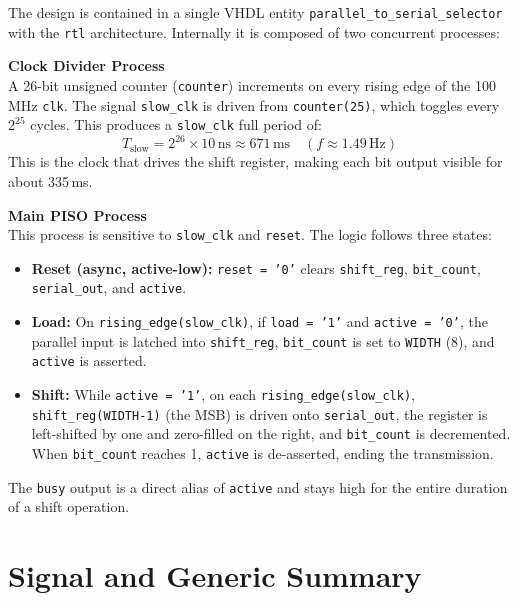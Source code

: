 \documentclass[12pt,a4paper]{report}
\begin{document}
The design is contained in a single VHDL entity \texttt{parallel\_to\_serial\_selector} with the \texttt{rtl} architecture. Internally it is composed of two concurrent processes:

\textbf{Clock Divider Process} \\
A 26-bit unsigned counter (\texttt{counter}) increments on every rising edge of the 100\,MHz \texttt{clk}. The signal \texttt{slow\_clk} is driven from \texttt{counter(25)}, which toggles every $2^{25}$ cycles. This produces a \texttt{slow\_clk} full period of:
\[
  T_{\text{slow}} = 2^{26} \times 10\,\text{ns} \approx 671\,\text{ms} \quad (f \approx 1.49\,\text{Hz})
\]
This is the clock that drives the shift register, making each bit output visible for about 335\,ms.

\textbf{Main PISO Process} \\
This process is sensitive to \texttt{slow\_clk} and \texttt{reset}. The logic follows three states:
\begin{itemize}[leftmargin=1.5em]
  \item \textbf{Reset (async, active-low):} \texttt{reset = '0'} clears \texttt{shift\_reg}, \texttt{bit\_count}, \texttt{serial\_out}, and \texttt{active}.
  \item \textbf{Load:} On \texttt{rising\_edge(slow\_clk)}, if \texttt{load = '1'} and \texttt{active = '0'}, the parallel input is latched into \texttt{shift\_reg}, \texttt{bit\_count} is set to \texttt{WIDTH} (8), and \texttt{active} is asserted.
  \item \textbf{Shift:} While \texttt{active = '1'}, on each \texttt{rising\_edge(slow\_clk)}, \texttt{shift\_reg(WIDTH-1)} (the MSB) is driven onto \texttt{serial\_out}, the register is left-shifted by one and zero-filled on the right, and \texttt{bit\_count} is decremented. When \texttt{bit\_count} reaches 1, \texttt{active} is de-asserted, ending the transmission.
\end{itemize}

The \texttt{busy} output is a direct alias of \texttt{active} and stays high for the entire duration of a shift operation.

\section{Signal and Generic Summary}
\end{document}
